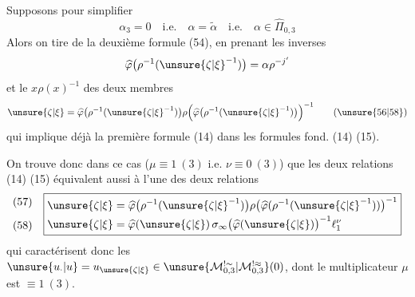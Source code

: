 Supposons pour simplifier
\[
\alpha_3=0\quad\text{i.e.}\quad\alpha=\widetilde\alpha\quad\text{i.e.}\quad\alpha\in\widehat\Pi_{0,3}
\tag{55}
\]
Alors on tire de la deuxième formule (54), en prenant les inverses
\[
\widehat{\varphi}\bigl(\rho^{-1}(\unsure{\zeta|\xi}^{-1})\bigr)=\alpha\rho^{-j'}
\]
et le $x\rho(x)^{-1}$ des deux membres
\[
\unsure{\zeta|\xi}=\widehat{\varphi}\bigl(\rho^{-1}(\unsure{\zeta|\xi}^{-1})\bigr)\rho\Bigl(\widehat{\varphi}\bigl(\rho^{-1}(\unsure{\zeta|\xi}^{-1})\bigr)\Bigr)^{-1}
\tag{\unsure{56|58}}
\]
qui implique déjà la première formule (14) dans les formules fond. (14) (15).


On trouve donc dans ce cas ($\mu\equiv1\ (3)$ i.e.
$\nu\equiv0\ (3)$) que les deux relations (14) (15)
équivalent aussi à l'une des deux relations
\[
\begin{array}{c@{\quad}c}
\begin{gathered}(57)\\[1.5ex](58)\end{gathered}&
\boxed{\begin{aligned}
\unsure{\zeta|\xi}&=
\widehat\varphi\bigl(\rho^{-1}(\unsure{\zeta|\xi}^{-1})\bigr)
\rho\bigl(\widehat\varphi(\rho^{-1}(\unsure{\zeta|\xi}^{-1}))\bigr)^{-1}
\\
\unsure{\zeta|\xi}&=\widehat\varphi(\unsure{\zeta|\xi})\,
\sigma_\infty\bigl(\widehat\varphi(\unsure{\zeta|\xi})\bigr)^{-1}
\ell_1^\nu
\end{aligned}}
\end{array}
\]
qui caractérisent donc les
$\unsure{u_{\cdot}|u}=u_{\unsure{\zeta|\xi}}\in
\unsure{\mathcal M_{0,3}^{!\sim}|\mathcal M_{0,3}^{!\approx}}(0)$,
dont le multiplicateur $\mu$ est $\equiv1\ (3)$.

